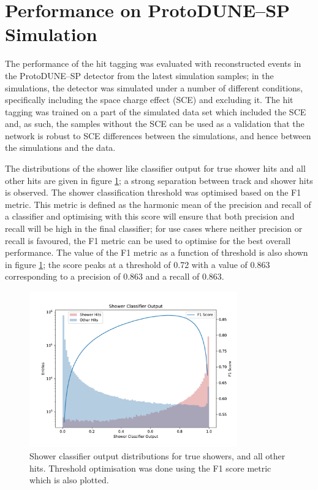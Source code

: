 \section{Performance on ProtoDUNE--SP Simulation} \label{cnn-perf-sim}

The performance of the hit tagging was evaluated with reconstructed events in
the ProtoDUNE--SP detector from the latest simulation samples; in the
simulations, the detector was simulated under a number of different conditions,
specifically including the space charge effect (SCE) \cite{Mooney:2015kke} and
excluding it. The hit tagging was trained on a part of the simulated data set
which included the SCE and, as such, the samples without the SCE can be used as
a validation that the network is robust to SCE differences between the
simulations, and hence between the simulations and the data.

The distributions of the shower like classifier output for true shower hits and
all other hits are given in figure \ref{fig:show_output}; a strong separation
between track and shower hits is observed. The shower classification threshold
was optimised based on the F1 metric. This metric is defined as the harmonic
mean of the precision and recall of a classifier and optimising with this score
will ensure that both precision and recall will be high in the final classifier;
for use cases where neither precision or recall is favoured, the F1 metric can
be used to optimise for the best overall performance. The value of the F1 metric
as a function of threshold is also shown in figure \ref{fig:show_output}; the
score peaks at a threshold of 0.72 with a value of 0.863 corresponding to a
precision of 0.863 and a recall of 0.863.  

\begin{figure}[h]
	\centering
	\includegraphics[width=0.8\textwidth]{figures/shower_combined.pdf} 
	\caption[Shower classifier output distributions.]{Shower classifier output
	distributions for true showers, and all other hits. Threshold optimisation
	was
	done using the F1 score metric which is also plotted.}
	\label{fig:show_output}
\end{figure}

